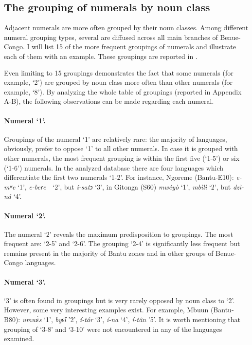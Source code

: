 \subsection{The grouping of numerals by noun class} %
Adjacent numerals are more often grouped by their noun classes. Among different numeral grouping types, several are diffused across all main branches of Benue-Congo. I will list 15 of the more frequent groupings of numerals and illustrate each of them with an example. These groupings are reported in . 

Even limiting  to 15 groupings demonstrates the fact that some numerals (for example, `2') are grouped by noun class more often than other numerals (for example, `8'). By analyzing the whole table of groupings (reported in Appendix A-B), the following observations can be made regarding each numeral. 

\paragraph*{Numeral `1'.} Groupings of the numeral `1' are relatively rare: the majority of languages, obviously, prefer to oppose ‘1’ to all other numerals. In case it is grouped with other numerals, the most frequent grouping is within the first five (‘1-5’) or six (‘1-6’) numerals. In the analyzed database there are four languages which differentiate the first two numerals ‘1-2’. For instance, Ngoreme (Bantu-E10): \textit{e-mʷe} ‘1’, \textit{e-beɾe}~~‘2’, but \textit{i-satɔ} ‘3’, in Gitonga (S60) \textit{mw{\'{e}}yò} ‘1’, \textit{mbìlì} ‘2’, but \textit{dzì-ná} ‘4’. 

\paragraph*{Numeral `2'.} The numeral `2' reveals the maximum predisposition to groupings. The most frequent are: ‘2-5’ and ‘2-6’. The grouping ‘2-4’ is significantly less frequent but remains present in the majority of Bantu zones and in other groups of Benue-Congo languages. 

\paragraph*{Numeral `3'.} `3' is often found in groupings but is very rarely opposed by noun class to `2'. However, some very interesting examples exist. For example, Mbuun (Bantu-B80): \textit{umw{\'{ɛ}}s} ‘1’, \textit{by{\v{ɛ}}l} ’2’, \textit{í-tár} ‘3’, \textit{í-na} ‘4’, \textit{í-tân} ’5’. It is worth mentioning that grouping of ‘3-8’ and ‘3-10’ were not encountered in any of the languages examined. 

